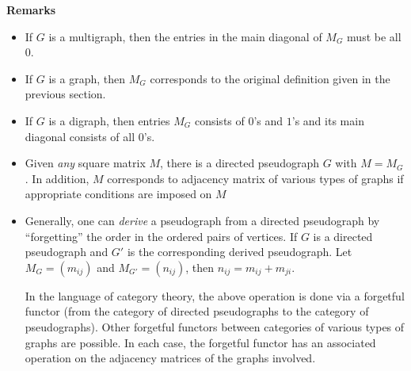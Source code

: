 \documentclass[12pt]{article}
\begin{document}
\textbf{Remarks}
\begin{itemize}
\item If $G$ is a multigraph, then the entries in the main diagonal of $M_G$ must be all $0$.
\item If $G$ is a graph, then $M_G$ corresponds to the original definition given in the previous section.
\item If $G$ is a digraph, then entries $M_G$ consists of $0$'s and $1$'s and its main diagonal consists of all $0$'s.
\item Given \emph{any} square matrix $M$, there is a directed pseudograph $G$ with $M=M_G$.  In addition, $M$ corresponds to adjacency matrix of various types of graphs if appropriate conditions are imposed on $M$
\item Generally, one can \emph{derive} a pseudograph from a directed pseudograph by ``forgetting'' the order in the ordered pairs of vertices.  If $G$ is a directed pseudograph and $G'$ is the corresponding derived pseudograph.  Let $M_G=(m_{ij})$ and $M_{G'}=(n_{ij})$, then $n_{ij}=m_{ij}+m_{ji}$.  

In the language of category theory, the above operation is done via a forgetful functor (from the category of directed pseudographs to the category of pseudographs).  Other forgetful functors between categories of various types of graphs are possible.  In each case, the forgetful functor has an associated operation on the adjacency matrices of the graphs involved.
\end{itemize}
\end{document}
